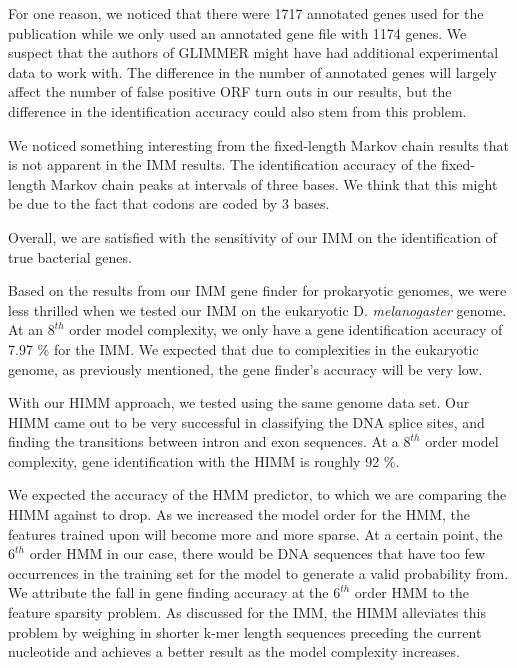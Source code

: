 \documentclass[11pt,letterpaper]{article}
\begin{document}
For one reason, we noticed that there were 1717 annotated genes used for the publication while we only used an annotated gene file with 1174 genes. We suspect that the authors of GLIMMER might have had additional experimental data to work with. The difference in the number of annotated genes will largely affect the number of false positive ORF turn outs in our results, but the difference in the identification accuracy could also stem from this problem.

We noticed something interesting from the fixed-length Markov chain results that is not apparent in the IMM results. The identification accuracy of the fixed-length Markov chain peaks at intervals of three bases. We think that this might be due to the fact that codons are coded by 3 bases. 

Overall, we are satisfied with the sensitivity of our IMM on the identification of true bacterial genes.

Based on the results from our IMM gene finder for prokaryotic genomes, we were less thrilled when we tested our IMM on the eukaryotic D. \emph{melanogaster} genome. At an $8^{th}$ order model complexity, we only have a gene identification accuracy of 7.97 \% for the IMM. We expected that due to complexities in the eukaryotic genome, as previously mentioned, the gene finder's accuracy will be very low. 

With our HIMM approach, we tested using the same genome data set. Our HIMM came out to be very successful in classifying the DNA splice sites, and finding the transitions between intron and exon sequences. At a $8^{th}$ order model complexity, gene identification with the HIMM is roughly 92 \%. 

We expected the accuracy of the HMM predictor, to which we are comparing the HIMM against to drop. As we increased the model order for the HMM, the features trained upon will become more and more sparse. At a certain point, the $6^{th}$ order HMM in our case, there would be DNA sequences that have too few occurrences in the training set for the model to generate a valid probability from. We attribute the fall in gene finding accuracy at the $6^{th}$ order HMM to the feature sparsity problem. As discussed for the IMM, the HIMM alleviates this problem by weighing in shorter k-mer length sequences preceding the current nucleotide and achieves a better result as the model complexity increases.
\end{document}
